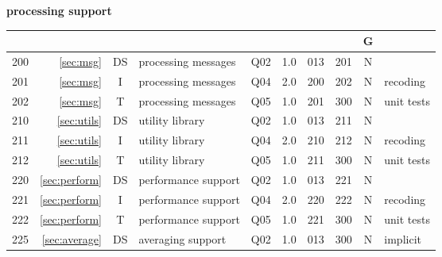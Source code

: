 \small
\textbf{processing support}\hfill\break
\noindent
\begin{tabular}{r|r|c|l|c|c|c|c|c|l}
\hline
\usebox{\NM}&\usebox{\REF}&\usebox{\WW}&\usebox{\TPC}&\usebox{\ST}&\usebox{\EFF}&\usebox{\PRD}&\usebox{\SCC}&G&\usebox{\CMTS}\\
\hline
\hline
200&\ref{sec:msg}                  &DS& processing messages  & Q02 & 1.0 & 013 & 201 & N &  \\
201&\ref{sec:msg}                  &I & processing messages  & Q04 & 2.0 & 200 & 202 & N & recoding \\
202&\ref{sec:msg}                  &T & processing messages  & Q05 & 1.0 & 201 & 300 & N & unit tests \\
210&\ref{sec:utils}                &DS& utility library      & Q02 & 1.0 & 013 & 211 & N &  \\
211&\ref{sec:utils}                &I & utility library      & Q04 & 2.0 & 210 & 212 & N & recoding \\
212&\ref{sec:utils}                &T & utility library      & Q05 & 1.0 & 211 & 300 & N & unit tests \\
220&\ref{sec:perform}              &DS& performance support  & Q02 & 1.0 & 013 & 221 & N &  \\
221&\ref{sec:perform}              &I & performance support  & Q04 & 2.0 & 220 & 222 & N & recoding \\
222&\ref{sec:perform}              &T & performance support  & Q05 & 1.0 & 221 & 300 & N & unit tests \\
225&\ref{sec:average}              &DS& averaging support    & Q02 & 1.0 & 013 & 300 & N & implicit \\
\hline
\end{tabular}\vspace{6mm}

